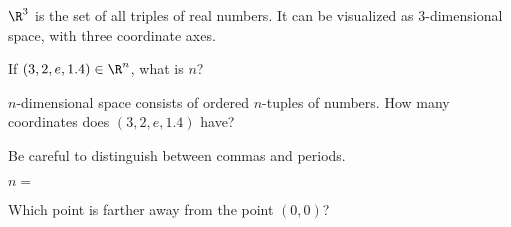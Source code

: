 \documentclass{ximera}
\begin{document}

\begin{example}
	$\R^3$ is the set of all triples of real numbers.  It can be visualized as $3$-dimensional space, with three coordinate axes. 
	
\end{example}


\begin{question}
  If $(3,2,e,1.4) \in \R^n$, what is $n$?
  \begin{solution}
    \begin{hint}
      $n$-dimensional space consists of ordered $n$-tuples of numbers.  How many coordinates does $(3,2,e,1.4)$ have?
    \end{hint}
    \begin{hint}
      \begin{warning}
        Be careful to distinguish between commas and periods.
      \end{warning}
    \end{hint}
    $n = $ 
  \end{solution}
\end{question}

\begin{question}
  Which point is farther away from the point $(0,0)$?

  \begin{solution}
    \begin{multiple-choice}
    \end{multiple-choice}    
  \end{solution}
\end{question}
\end{document}
